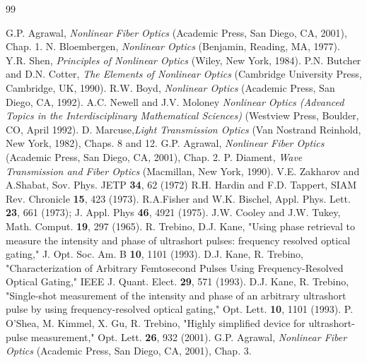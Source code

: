 
\vspace*{-1in}

\begin{thebibliography}{99}
\vspace{-.25in}

\setlength{\parskip}{1em}

 G.P. Agrawal, {\em Nonlinear Fiber Optics} (Academic
Press, San Diego, CA, 2001), Chap. 1.
 N. Bloembergen, {\em Nonlinear Optics} (Benjamin,
Reading, MA, 1977).
 Y.R. Shen, {\em Principles of Nonlinear Optics} (Wiley, New
York, 1984).
 P.N. Butcher and D.N. Cotter, {\em The Elements of
Nonlinear Optics} (Cambridge University Press, Cambridge, UK, 1990).
 R.W. Boyd, {\em Nonlinear Optics} (Academic Press, San Diego,
CA, 1992).
 A.C. Newell and J.V. Moloney {\em Nonlinear Optics (Advanced Topics in the Interdisciplinary Mathematical Sciences)} (Westview Press, Boulder, CO, April 1992).
 D. Marcuse,{\em Light Transmission Optics} (Van Nostrand
Reinhold, New York, 1982), Chaps. 8 and 12.
 G.P. Agrawal, {\em Nonlinear Fiber Optics} (Academic
Press, San Diego, CA, 2001), Chap. 2.
 P. Diament, {\em Wave Transmission and Fiber Optics}
(Macmillan, New York, 1990).
 V.E. Zakharov and A.Shabat, Sov. Phys. JETP
\textbf{34}, 62 (1972)
 R.H. Hardin and F.D. Tappert, SIAM
Rev. Chronicle \textbf{15}, 423 (1973).
 R.A.Fisher and
W.K. Bischel, Appl. Phys. Lett. \textbf{23}, 661 (1973); J. Appl. Phys
\textbf{46}, 4921 (1975).
 J.W. Cooley and J.W. Tukey,
Math. Comput. \textbf{19}, 297 (1965).
 R. Trebino, D.J. Kane, "Using phase retrieval to measure
the intensity and phase of ultrashort pulses: frequency resolved optical gating," J. Opt. Soc. Am. B \textbf{10}, 1101 (1993).
 D.J. Kane, R. Trebino, "Characterization of Arbitrary Femtosecond Pulses Using Frequency-Resolved Optical Gating," IEEE J. Quant. Elect. \textbf{29}, 571 (1993).
 D.J. Kane, R. Trebino, "Single-shot measurement of the intensity and phase of an arbitrary ultrashort pulse  by using frequency-resolved optical gating," Opt. Lett. \textbf{10}, 1101 (1993).
P. O'Shea, M. Kimmel, X. Gu, R. Trebino, "Highly simplified device for ultrashort-pulse measurement," Opt. Lett. \textbf{26}, 932 (2001).
 G.P. Agrawal, {\em Nonlinear Fiber Optics} (Academic
Press, San Diego, CA, 2001), Chap. 3.

\end{thebibliography}
